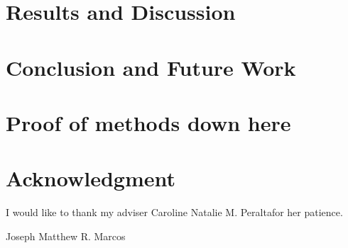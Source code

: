 \documentclass[journal]{./IEEE/IEEEtran}
\newcommand{\ADVISEE}{Joseph Matthew R. Marcos}
\newcommand{\ADVISER}{Caroline Natalie M. Peralta}
\begin{document}
\section{Results and Discussion}
\section{Conclusion and Future Work}
\appendices

\section{Proof of methods down here}

\section{}

\section*{Acknowledgment}
I would like to thank my adviser \ADVISER for her patience.

\begin{biography}{\ADVISEE}
\end{biography}


\newpage
% 


\end{document}
